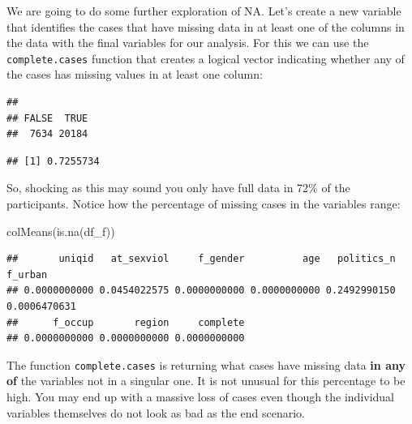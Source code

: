\documentclass[
]{book}
\newenvironment{Shaded}{\begin{snugshade}}{\end{snugshade}}
\newcommand{\FunctionTok}[1]{\textcolor[rgb]{0.00,0.00,0.00}{#1}}
\newcommand{\NormalTok}[1]{#1}
\newcommand{\OtherTok}[1]{\textcolor[rgb]{0.56,0.35,0.01}{#1}}
\newcommand{\SpecialCharTok}[1]{\textcolor[rgb]{0.00,0.00,0.00}{#1}}
\begin{document}
We are going to do some further exploration of NA. Let's create a new variable that identifies the cases that have missing data in at least one of the columns in the data with the final variables for our analysis. For this we can use the \texttt{complete.cases} function that creates a logical vector indicating whether any of the cases has missing values in at least one column:

\begin{Shaded}
\end{Shaded}

\begin{verbatim}
## 
## FALSE  TRUE 
##  7634 20184
\end{verbatim}

\begin{Shaded}
\end{Shaded}

\begin{verbatim}
## [1] 0.7255734
\end{verbatim}

So, shocking as this may sound you only have full data in 72\% of the participants. Notice how the percentage of missing cases in the variables range:

\begin{Shaded}
\begin{Highlighting}[]
\FunctionTok{colMeans}\NormalTok{(}\FunctionTok{is.na}\NormalTok{(df\_f))}
\end{Highlighting}
\end{Shaded}

\begin{verbatim}
##       uniqid   at_sexviol     f_gender          age   politics_n      f_urban 
## 0.0000000000 0.0454022575 0.0000000000 0.0000000000 0.2492990150 0.0006470631 
##      f_occup       region     complete 
## 0.0000000000 0.0000000000 0.0000000000
\end{verbatim}

The function \texttt{complete.cases} is returning what cases have missing data \textbf{in any of} the variables not in a singular one. It is not unusual for this percentage to be high. You may end up with a massive loss of cases even though the individual variables themselves do not look as bad as the end scenario.
\end{document}

